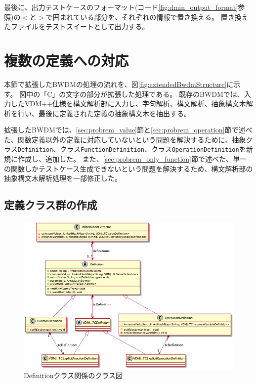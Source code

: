 \documentclass[uplatex, report, a4j, 10pt]{jsbook}
\newcommand\ttt[1]{\texttt{#1}}
\begin{document}
最後に、出力テストケースのフォーマット(コード\ref{fig:dmin_output_format}参照)の$<$と$>$で囲まれている部分を、それぞれの情報で置き換える。
置き換えたファイルをテストスイートとして出力する。

\section{複数の定義への対応}\label{sec:extendMultiple}
本節で拡張したBWDMの処理の流れを、図\ref{fig:extendedBwdmStructure}に示す。
図中の「C」の文字の部分が拡張した処理である。
既存のBWDMでは、入力したVDM++仕様を構文解析部に入力し、字句解析、構文解析、抽象構文木解析を行い、最後に定義された定義の抽象構文木を抽出する。

拡張したBWDMでは、\ref{sec:probrem_value}節と\ref{sec:probrem_operation}節で述べた、関数定義以外の定義に対応していないという問題を解決するために、抽象クラス\ttt{Definition}、クラス\ttt{FunctionDefinition}、クラス\ttt{OperationDefinition}を新規に作成し、追加した。
また、\ref{sec:probrem_only_function}節で述べた、単一の関数しかテストケース生成できないという問題を解決するため、構文解析部の抽象構文木解析処理を一部修正した。

\subsection{定義クラス群の作成}\label{sec:create_definition}
\begin{figure}[tp]
  \centering
  \includegraphics[keepaspectratio, width=160mm]{figs/Definition_class_diagram}
  \caption{Definitionクラス関係のクラス図}
  \label{fig:definition_class}
\end{figure}
\end{document}

